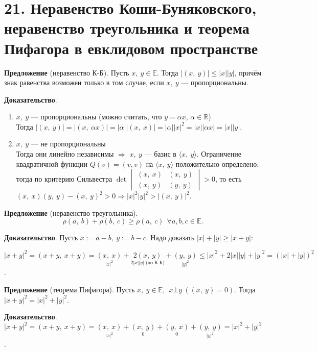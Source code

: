 \documentclass[a4paper, 12pt]{article}
\newcommand{\E}{\mathbb{E}}
\newcommand{\R}{\mathbb{R}}
\begin{document}
\section*{21. Неравенство Коши-Буняковского, неравенство треугольника и теорема Пифагора в евклидовом пространстве}
\textbf{Предложение} (неравенство К-Б). Пусть $x,\ y \in \E$. Тогда $|(x,\ y)| \leqslant |x||y|$, причём знак равенства возможен только в том случае, если $x,\ y$ --- пропорциональны.

\textbf{Доказательство}.
\vspace{-3mm}
\begin{enumerate}
\itemsep=0em
\item $x,\ y$ --- пропорциональны (можно считать, что $y = \alpha x$, $\alpha \in \R$) \\
Тогда $|(x,\ y)| = |(x,\ \alpha x)| = |\alpha||(x,\ x)| = |\alpha||x|^2 = |x||\alpha x| = |x||y|$.
\item $x,\ y$ --- не пропорциональны \\
Тогда они линейно независимы $\Longrightarrow$ $x,\ y$ --- базис в $\langle x,\ y \rangle$. Ограничение квадратичной функции $Q(v) = (v, v)$ на $\langle x,\ y \rangle$ положительно определено; тогда по критерию Сильвестра $\det
\begin{vmatrix}
(x,\ x) & (x,\ y) \\
(x,\ y) & (y,\ y)
\end{vmatrix} > 0$, то есть $(x,\ x)(y,\ y) - (x,\ y)^2 > 0 \Longrightarrow |x|^2 |y|^2 > |(x,\ y)|^2$.
\end{enumerate}

\vspace{5mm}
\textbf{Предложение} (неравенство треугольника).
\vspace{-3mm}
\[
\rho(a,\ b) + \rho(b,\ c) \geqslant \rho(a,\ c)\ \ \forall a, b, c \in \E.
\]

\textbf{Доказательство}. Пусть $x := a - b,\ y := b - c$. Надо доказать $|x| + |y| \geqslant |x + y|$:

$|x + y|^2 = (x + y,\ x + y) = \underset{|x|^2}{(x,\ x)} + \underset{2|x||y|\text{ (по К-Б)}}{2(x,\ y)} + \underset{|y|^2}{(y,\ y)} \leqslant |x|^2 + 2|x||y| + |y|^2 = (|x| + |y|)^2$.

\vspace{5mm}
\textbf{Предложение} (теорема Пифагора). Пусть $x,\ y \in \E,\ \ x\bot y\ ((x,\ y) = 0)$. Тогда $|x + y|^2 = |x|^2 + |y|^2$.

\textbf{Доказательство}. $|x + y|^2 = (x + y,\ x + y) = \underset{|x|^2}{(x,\ x)} + \underset{0}{(x,\ y)} + \underset{0}{(y,\ x)} + \underset{|y|^2}{(y,\ y)} = |x|^2 + |y|^2$.
\end{document}
